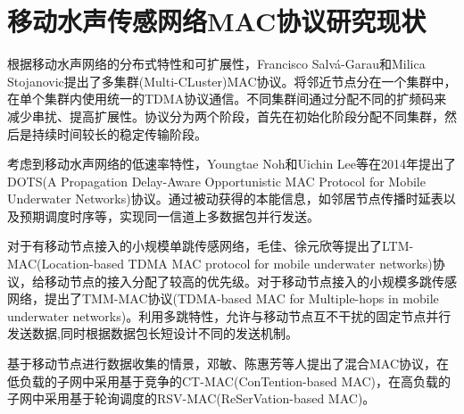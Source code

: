 \section{移动水声传感网络MAC协议研究现状}
根据移动水声网络的分布式特性和可扩展性，Francisco Salvá-Garau和Milica Stojanovic提出了多集群(Multi-CLuster)\cite{Multi-Cluster Protocol for Ad Hoc Mobile Underwater Acoustic Networks Oceans2003}MAC协议。将邻近节点分在一个集群中，在单个集群内使用统一的TDMA协议通信。不同集群间通过分配不同的扩频码来减少串扰、提高扩展性。协议分为两个阶段，首先在初始化阶段分配不同集群，然后是持续时间较长的稳定传输阶段。

考虑到移动水声网络的低速率特性，Youngtae Noh和Uichin Lee等在2014年提出了DOTS(A Propagation Delay-Aware Opportunistic MAC Protocol for Mobile Underwater Networks)协议。通过被动获得的本能信息，如邻居节点传播时延表以及预期调度时序等，实现同一信道上多数据包并行发送。\cite{DOTS: A Propagation Delay-Aware Opportunistic MAC Protocol for Mobile Underwater Networks}

对于有移动节点接入的小规模单跳传感网络，毛佳、徐元欣等提出了LTM-MAC(Location-based TDMA MAC protocol for mobile underwater networks)\cite{LTM-MAC: A location-based TDMA MAC protocol for mobile underwater networks}协议，给移动节点的接入分配了较高的优先级。对于移动节点接入的小规模多跳传感网络，提出了TMM-MAC协议(TDMA-based MAC for Multiple-hops in mobile underwater networks)。利用多跳特性，允许与移动节点互不干扰的固定节点并行发送数据,同时根据数据包长短设计不同的发送机制。

基于移动节点进行数据收集的情景，邓敏、陈惠芳等人提出了混合MAC协议\cite{A Hybrid MAC Protocol in Data-collection-oriented
	Underwater Acoustic Sensor Networks}，在低负载的子网中采用基于竞争的CT-MAC(ConTention-based MAC)，在高负载的子网中采用基于轮询调度的RSV-MAC(ReSerVation-based MAC)。



\endinput